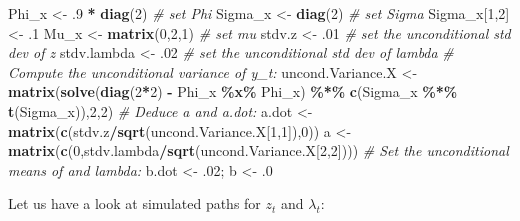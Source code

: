 \documentclass[
  12pt,
]{book}
\newenvironment{Shaded}{\begin{snugshade}}{\end{snugshade}}
\newcommand{\CommentTok}[1]{\textcolor[rgb]{0.56,0.35,0.01}{\textit{#1}}}
\newcommand{\DecValTok}[1]{\textcolor[rgb]{0.00,0.00,0.81}{#1}}
\newcommand{\FunctionTok}[1]{\textcolor[rgb]{0.13,0.29,0.53}{\textbf{#1}}}
\newcommand{\NormalTok}[1]{#1}
\newcommand{\OtherTok}[1]{\textcolor[rgb]{0.56,0.35,0.01}{#1}}
\newcommand{\SpecialCharTok}[1]{\textcolor[rgb]{0.81,0.36,0.00}{\textbf{#1}}}
\theoremstyle{definition}
\theoremstyle{definition}
\theoremstyle{definition}
\theoremstyle{definition}
\theoremstyle{remark}
\begin{document}
\begin{Shaded}
\begin{Highlighting}[]
\NormalTok{Phi\_x }\OtherTok{\textless{}{-}}\NormalTok{ .}\DecValTok{9} \SpecialCharTok{*} \FunctionTok{diag}\NormalTok{(}\DecValTok{2}\NormalTok{) }\CommentTok{\# set Phi}
\NormalTok{Sigma\_x }\OtherTok{\textless{}{-}} \FunctionTok{diag}\NormalTok{(}\DecValTok{2}\NormalTok{) }\CommentTok{\# set Sigma}
\NormalTok{Sigma\_x[}\DecValTok{1}\NormalTok{,}\DecValTok{2}\NormalTok{] }\OtherTok{\textless{}{-}}\NormalTok{ .}\DecValTok{1}
\NormalTok{Mu\_x }\OtherTok{\textless{}{-}} \FunctionTok{matrix}\NormalTok{(}\DecValTok{0}\NormalTok{,}\DecValTok{2}\NormalTok{,}\DecValTok{1}\NormalTok{) }\CommentTok{\# set mu}
\NormalTok{stdv.z      }\OtherTok{\textless{}{-}}\NormalTok{ .}\DecValTok{01} \CommentTok{\# set the unconditional std dev of z}
\NormalTok{stdv.lambda }\OtherTok{\textless{}{-}}\NormalTok{ .}\DecValTok{02} \CommentTok{\# set the unconditional std dev of lambda}
\CommentTok{\# Compute the unconditional variance of y\_t:}
\NormalTok{uncond.Variance.X }\OtherTok{\textless{}{-}} \FunctionTok{matrix}\NormalTok{(}\FunctionTok{solve}\NormalTok{(}\FunctionTok{diag}\NormalTok{(}\DecValTok{2}\SpecialCharTok{*}\DecValTok{2}\NormalTok{) }\SpecialCharTok{{-}}\NormalTok{ Phi\_x }\SpecialCharTok{\%x\%}\NormalTok{ Phi\_x) }\SpecialCharTok{\%*\%}
                              \FunctionTok{c}\NormalTok{(Sigma\_x }\SpecialCharTok{\%*\%} \FunctionTok{t}\NormalTok{(Sigma\_x)),}\DecValTok{2}\NormalTok{,}\DecValTok{2}\NormalTok{)}
\CommentTok{\# Deduce a and a.dot:}
\NormalTok{a.dot }\OtherTok{\textless{}{-}} \FunctionTok{matrix}\NormalTok{(}\FunctionTok{c}\NormalTok{(stdv.z}\SpecialCharTok{/}\FunctionTok{sqrt}\NormalTok{(uncond.Variance.X[}\DecValTok{1}\NormalTok{,}\DecValTok{1}\NormalTok{]),}\DecValTok{0}\NormalTok{))}
\NormalTok{a     }\OtherTok{\textless{}{-}} \FunctionTok{matrix}\NormalTok{(}\FunctionTok{c}\NormalTok{(}\DecValTok{0}\NormalTok{,stdv.lambda}\SpecialCharTok{/}\FunctionTok{sqrt}\NormalTok{(uncond.Variance.X[}\DecValTok{2}\NormalTok{,}\DecValTok{2}\NormalTok{])))}
\CommentTok{\# Set the unconditional means of and lambda:}
\NormalTok{b.dot }\OtherTok{\textless{}{-}}\NormalTok{ .}\DecValTok{02}\NormalTok{; b }\OtherTok{\textless{}{-}}\NormalTok{ .}\DecValTok{0}
\end{Highlighting}
\end{Shaded}

Let us have a look at simulated paths for \(z_t\) and \(\lambda_t\):
\end{document}
